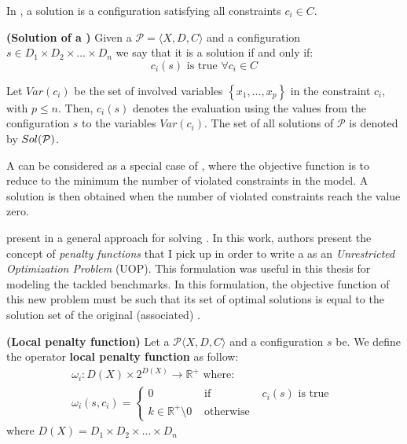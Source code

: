 In \csps, a solution is a configuration satisfying all constraints $c_i \in C$. %

\begin{definition}{\bf (Solution of a \csp)}
\label{solCSP}
Given a \csp{} $\mathcal{P}=\langle X,D,C \rangle$ and a configuration $s \in D_1\times D_2\times\dots\times D_n$ we say that it is a solution if and only if:	
\begin{equation*}
c_i\left(s\right)\text{ is true }\forall c_i \in C
\end{equation*}
\end{definition}

Let $Var(c_i)$ be the set of involved variables $\left\{x_1, \dots, x_p\right\}$ in the constraint $c_i$, with $p\leq n$. Then, $c_i\left(s\right)$ denotes the evaluation using the values from the configuration $s$ to the variables $Var(c_i)$. The set of all solutions of $\mathcal{P}$ is denoted by $\mathnormal{Sol}(\mathcal{P})$.

A \csp{} can be considered as a special case of \cops, where the objective function is to reduce to the minimum the number of violated constraints in the model. A solution is then obtained when the number of violated constraints reach the value zero. 

 present in \cite{Galinier04} a general approach for solving \csps{}. In this work, authors present the concept of {\it penalty functions} that I pick up in order to write a \csp{} as an \textit{Unrestricted Optimization Problem} (UOP). This formulation was useful in this thesis for modeling the tackled benchmarks. In this formulation, the objective function of this new problem must be such that its set of optimal solutions is equal to the solution set of the original (associated) \csp.

\begin{definition}{\bf (Local penalty function)}
\label{def:local_cost}
Let a {\bf \csp} $\mathcal{P}\langle X,D,C \rangle$ and a configuration $s$ be. We define the operator {\bf local penalty function} as follow: 
\begin{equation*}
\begin{array}{l}
	\omega_i:D\left(X\right)\times 2^{D\left(X\right)}\rightarrow\mathbb{R}^+\text{ where: }\\
	\omega_i\left(s,c_i\right)=\left\{
	\begin{array}{lll}
	0 & \text{ if } & c_i(s)\text{ is true }\\
	k \in \mathbb{R}^+ \setminus {0} & \text{ otherwise } &
	\end{array}
	\right.
\end{array}
\end{equation*}
where $D\left(X\right) = D_1\times D_2 \times\dots\times D_n$
\end{definition}

